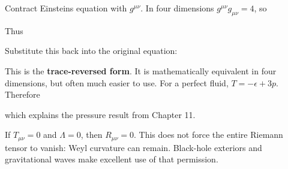 \documentclass[
  11pt,
  letterpaper,
  oneside,
  openany]{scrbook}
\begin{document}
Contract Einstein\textquotesingle s equation with \(g^{\mu\nu}\). In
four dimensions \(g^{\mu\nu}g_{\mu\nu}=4\), so

\begin{center}
\begingroup
{}
\ifdim\wd\grmathbox>\linewidth
\resizebox{\linewidth}{!}{\usebox{\grmathbox}}
\else\usebox{\grmathbox}\fi
\endgroup
\end{center}

Thus

\begin{center}
\begingroup
{}
\ifdim\wd\grmathbox>\linewidth
\resizebox{\linewidth}{!}{\usebox{\grmathbox}}
\else\usebox{\grmathbox}\fi
\endgroup
\end{center}

Substitute this back into the original equation:

\begin{center}
\begingroup
{}
\ifdim\wd\grmathbox>\linewidth
\resizebox{\linewidth}{!}{\usebox{\grmathbox}}
\else\usebox{\grmathbox}\fi
\endgroup
\end{center}

This is the \textbf{trace-reversed form}. It is mathematically
equivalent in four dimensions, but often much easier to use. For a
perfect fluid, \(T=-\epsilon+3p\). Therefore

\begin{center}
\begingroup
{}
\ifdim\wd\grmathbox>\linewidth
\resizebox{\linewidth}{!}{\usebox{\grmathbox}}
\else\usebox{\grmathbox}\fi
\endgroup
\end{center}

which explains the pressure result from Chapter 11.

If \(T_{\mu\nu}=0\) and \(\Lambda=0\), then \(R_{\mu\nu}=0\). This does
not force the entire Riemann tensor to vanish: Weyl curvature can
remain. Black-hole exteriors and gravitational waves make excellent use
of that permission.
\end{document}

